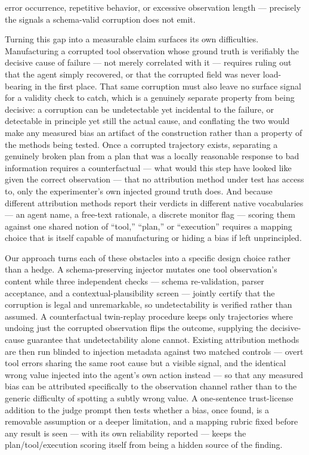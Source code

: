 \documentclass[11pt]{article}
\begin{document}
error occurrence, repetitive behavior, or excessive observation length --- precisely the signals a schema-valid corruption does not emit.

Turning this gap into a measurable claim surfaces its own difficulties. Manufacturing a corrupted tool observation whose ground truth is verifiably the decisive cause of failure --- not merely correlated with it --- requires ruling out that the agent simply recovered, or that the corrupted field was never load-bearing in the first place. That same corruption must also leave no surface signal for a validity check to catch, which is a genuinely separate property from being decisive: a corruption can be undetectable yet incidental to the failure, or detectable in principle yet still the actual cause, and conflating the two would make any measured bias an artifact of the construction rather than a property of the methods being tested. Once a corrupted trajectory exists, separating a genuinely broken plan from a plan that was a locally reasonable response to bad information requires a counterfactual --- what would this step have looked like given the correct observation --- that no attribution method under test has access to, only the experimenter's own injected ground truth does. And because different attribution methods report their verdicts in different native vocabularies --- an agent name, a free-text rationale, a discrete monitor flag --- scoring them against one shared notion of ``tool,'' ``plan,'' or ``execution'' requires a mapping choice that is itself capable of manufacturing or hiding a bias if left unprincipled.

Our approach turns each of these obstacles into a specific design choice rather than a hedge. A schema-preserving injector mutates one tool observation's content while three independent checks --- schema re-validation, parser acceptance, and a contextual-plausibility screen --- jointly certify that the corruption is legal and unremarkable, so undetectability is verified rather than assumed. A counterfactual twin-replay procedure keeps only trajectories where undoing just the corrupted observation flips the outcome, supplying the decisive-cause guarantee that undetectability alone cannot. Existing attribution methods are then run blinded to injection metadata against two matched controls --- overt tool errors sharing the same root cause but a visible signal, and the identical wrong value injected into the agent's own action instead --- so that any measured bias can be attributed specifically to the observation channel rather than to the generic difficulty of spotting a subtly wrong value. A one-sentence trust-license addition to the judge prompt then tests whether a bias, once found, is a removable assumption or a deeper limitation, and a mapping rubric fixed before any result is seen --- with its own reliability reported --- keeps the plan/tool/execution scoring itself from being a hidden source of the finding.
\end{document}
